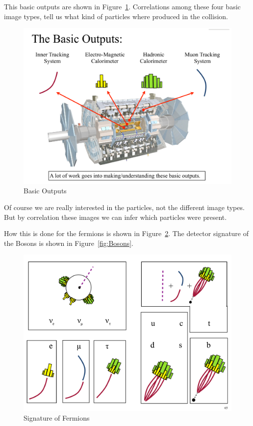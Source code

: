 {This basic outputs are shown in Figure~\ref{fig:BasicInputs}.
Correlations among these four basic image types, tell us what kind of particles where produced in the collision.

\begin{figure}[h]
\centering
\includegraphics[width=1.0\textwidth]{./BasicInputs.pdf}
\caption{Basic Outputs}\label{fig:BasicInputs}
\end{figure}

\clearpage

Of course we are really interested in the particles,  not the different image types. 
But by correlation these images we can infer which particles were present. 

How this is done for the fermions is shown in Figure~\ref{fig:Fermions}.
The detector signature of the Bosons is shown in Figure~\ref{fig:Bosons}.
\begin{figure}[h]
\centering
\includegraphics[width=1.0\textwidth]{./Fermions.pdf}
\caption{Signature of Fermions}\label{fig:Fermions}
\end{figure}

}
